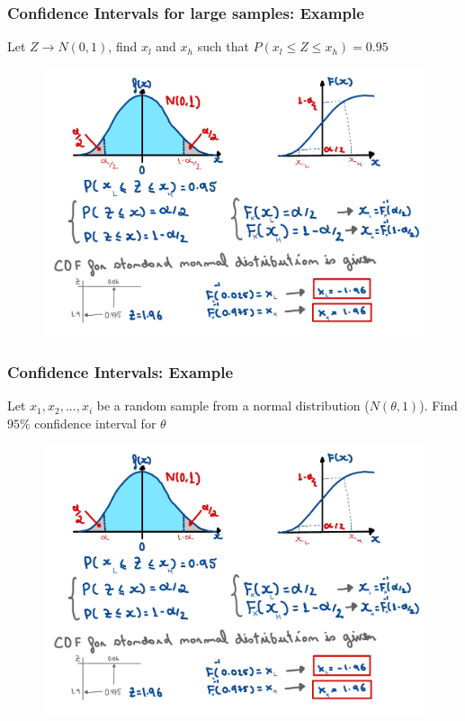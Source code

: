 \begin{frame}
    \frametitle{Confidence Intervals for large samples: Example}
    Let $Z\rightarrow N(0,1)$, find $x_l$ and $x_h$ such that $P(x_l \leq Z \leq x_h) = 0.95$
    \begin{figure}
        \centering
        \includegraphics[width=1\textwidth]{slides/figures/interval_example_one.pdf}
    \end{figure}
\end{frame}

\begin{frame}
    \frametitle{Confidence Intervals: Example}
    Let $x_1, x_2,..., x_i$ be a random sample from a normal distribution ($N(\theta,1)$). Find $95\%$ confidence interval
    for $\theta$
    \begin{figure}
        \centering
        \includegraphics[width=1\textwidth]{slides/figures/interval_example.pdf}
    \end{figure}
\end{frame}


